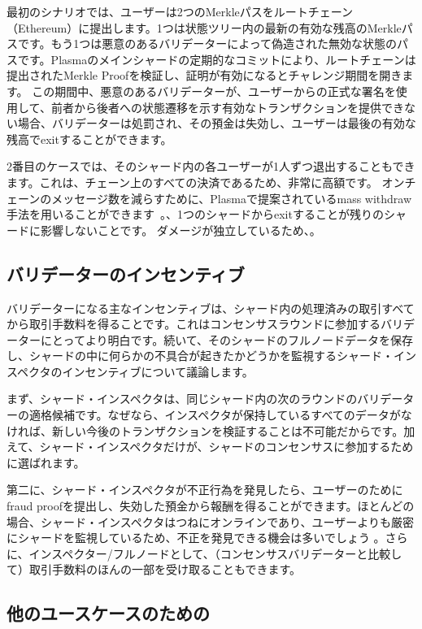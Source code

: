 最初のシナリオでは、ユーザーは2つのMerkleパスをルートチェーン（Ethereum）に提出します。1つは状態ツリー内の最新の有効な残高のMerkleパスです。もう1つは悪意のあるバリデーターによって偽造された無効な状態のパスです。Plasmaのメインシャードの定期的なコミットにより、ルートチェーンは提出されたMerkle Proofを検証し、証明が有効になるとチャレンジ期間を開きます。 この期間中、悪意のあるバリデーターが、ユーザーからの正式な署名を使用して、前者から後者への状態遷移を示す有効なトランザクションを提供できない場合、バリデーターは処罰され、その預金は失効し、ユーザーは最後の有効な残高でexitすることができます。

2番目のケースでは、そのシャード内の各ユーザーが1人ずつ退出することもできます。これは、チェーン上のすべての決済であるため、非常に高額です。 オンチェーンのメッセージ数を減らすために、Plasmaで提案されているmass withdraw手法を用いることができます~\cite{plasma}。、1つのシャードからexitすることが残りのシャードに影響しないことです。 ダメージが独立しているため、。

\subsection{バリデーターのインセンティブ}
バリデーターになる主なインセンティブは、シャード内の処理済みの取引すべてから取引手数料を得ることです。これはコンセンサスラウンドに参加するバリデーターにとってより明白です。続いて、そのシャードのフルノードデータを保存し、シャードの中に何らかの不具合が起きたかどうかを監視するシャード・インスペクタのインセンティブについて議論します。

まず、シャード・インスペクタは、同じシャード内の次のラウンドのバリデーターの適格候補です。なぜなら、インスペクタが保持しているすべてのデータがなければ、新しい今後のトランザクションを検証することは不可能だからです。加えて、シャード・インスペクタだけが、シャードのコンセンサスに参加するために選ばれます。

第二に、シャード・インスペクタが不正行為を発見したら、ユーザーのためにfraud proofを提出し、失効した預金から報酬を得ることができます。ほとんどの場合、シャード・インスペクタはつねにオンラインであり、ユーザーよりも厳密にシャードを監視しているため、不正を発見できる機会は多いでしょう 。さらに、インスペクター/フルノードとして、（コンセンサスバリデーターと比較して）取引手数料のほんの一部を受け取ることもできます。

\subsection{他のユースケースのための\codename}
\label{sec:others}

